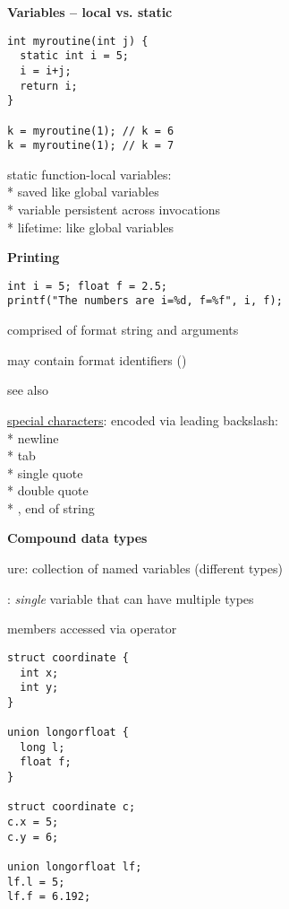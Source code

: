 \textbf{Variables -- local vs. static}
\begin{lstlisting}[style=customc]
int myroutine(int j) {
  static int i = 5;
  i = i+j;
  return i;
}

k = myroutine(1); // k = 6
k = myroutine(1); // k = 7
\end{lstlisting}
\begin{items}
  \item static function-local variables: \\*
    saved like global variables \\*
    variable persistent across invocations \\*
    lifetime: like global variables
\end{items}

\textbf{Printing}
\begin{lstlisting}[style=customc]
int i = 5; float f = 2.5;
printf("The numbers are i=%d, f=%f", i, f);
\end{lstlisting}
\begin{items}
  \item comprised of format string and arguments
  \item may contain format identifiers ()
  \item see also 
  \item \underline{special characters}: encoded via leading backslash: \\*
    \code{\\n} newline \\*
    \code{\\t} tab \\*
     single quote \\*
     double quote \\*
     , end of string
\end{items}

\textbf{Compound data types}
\begin{items}
  \item {}ure: collection of named variables (different types)
  \item {}: \emph{single} variable that can have multiple types
  \item members accessed via  operator
\end{items}
\begin{lstlisting}[style=customc]
struct coordinate {
  int x;
  int y;
}

union longorfloat {
  long l;
  float f;
}

struct coordinate c;
c.x = 5;
c.y = 6;

union longorfloat lf;
lf.l = 5;
lf.f = 6.192;
\end{lstlisting}

